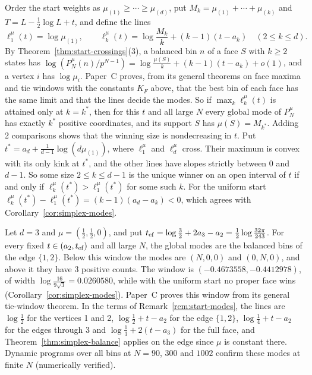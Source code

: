 \begin{remark}\label{rem:start-modes}
Order the start weights as $\mu_{(1)}\ge\cdots\ge\mu_{(d)}$, put
$M_k=\mu_{(1)}+\cdots+\mu_{(k)}$ and $T=L-\frac12\log L+t$, and define the lines
\[
 \ell^\mu_1(t)=\log\mu_{(1)},\qquad
 \ell^\mu_k(t)=\log\frac{M_k}k+(k-1)(t-a_k)\quad(2\le k\le d).
\]
By Theorem~\ref{thm:start-crossings}(3), a balanced bin $n$ of a face $S$ with
$k\ge2$ states has $\log(P^\mu_N(n)/p^{N-1})=\log\frac{\mu(S)}k+(k-1)(t-a_k)+o(1)$,
and a vertex $i$ has $\log\mu_i$. Paper~C proves, from its general theorems on
face maxima and tie windows with the constants $K_F$ above, that the best bin of
each face has the same limit and that the lines decide the modes. So if
$\max_k\ell^\mu_k(t)$ is attained only at $k=k^*$, then for this $t$ and all
large $N$ every global mode of $P^\mu_N$ has exactly $k^*$ positive coordinates,
and its support $S$ has $\mu(S)=M_{k^*}$. Adding 2 comparisons shows that the
winning size is nondecreasing in $t$. Put $t^*=a_d+\frac1{d-1}\log(d\mu_{(1)})$,
where $\ell^\mu_1$ and $\ell^\mu_d$ cross. Their maximum is convex with its only
kink at $t^*$, and the other lines have slopes strictly between $0$ and $d-1$.
So some size $2\le k\le d-1$ is the unique winner on an open interval of $t$ if
and only if $\ell^\mu_k(t^*)>\ell^\mu_1(t^*)$ for some such $k$. For the uniform
start $\ell^\mu_k(t^*)-\ell^\mu_1(t^*)=(k-1)(a_d-a_k)<0$, which agrees with
Corollary~\ref{cor:simplex-modes}.
\end{remark}

\begin{remark}\label{ex:K3-start}
Let $d=3$ and $\mu=(\frac12,\frac12,0)$, and put
$t_{\rm ef}=\log\frac32+2a_3-a_2=\frac12\log\frac{32\pi}{243}$. For every fixed
$t\in(a_2,t_{\rm ef})$ and all large $N$, the global modes are the balanced bins
of the edge $\{1,2\}$. Below this window the modes are $(N,0,0)$ and $(0,N,0)$,
and above it they have 3 positive counts. The window is
$(-0.4673558,-0.4412978)$, of width $\log\frac{16}{9\sqrt3}=0.0260580$, while
with the uniform start no proper face wins (Corollary~\ref{cor:simplex-modes}).
Paper~C proves this window from its general tie-window theorem. In the terms of
Remark~\ref{rem:start-modes}, the lines are $\log\frac12$ for the vertices 1
and 2, $\log\frac12+t-a_2$ for the edge $\{1,2\}$, $\log\frac14+t-a_2$ for the
edges through 3 and $\log\frac13+2(t-a_3)$ for the full face, and
Theorem~\ref{thm:simplex-balance} applies on the edge since $\mu$ is constant
there. Dynamic programs over all bins at $N=90$, $300$ and $1002$ confirm these
modes at finite $N$ (numerically verified).
\end{remark}

